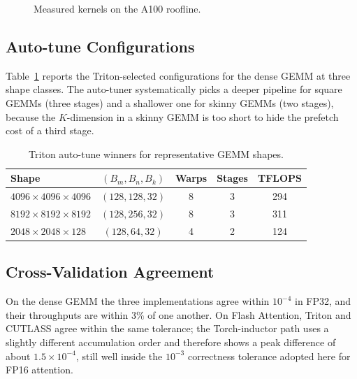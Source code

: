 \begin{figure}[H]
\centering
{}
\caption{Measured kernels on the A100 roofline.}
\label{fig:triton_roofline}
\end{figure}

\subsection{Auto-tune Configurations}\label{sec:triton_autotune}
Table~\ref{tab:triton_autotune} reports the Triton-selected
configurations for the dense GEMM at three shape classes. The
auto-tuner systematically picks a deeper pipeline for square
GEMMs (three stages) and a shallower one for skinny GEMMs (two
stages), because the $K$-dimension in a skinny GEMM is too short
to hide the prefetch cost of a third stage.

\begin{table}[h]
\centering
\caption{Triton auto-tune winners for representative GEMM shapes.}
\label{tab:triton_autotune}
\begin{tabular}{lcccc}
\toprule
\textbf{Shape} & $(B_m, B_n, B_k)$ & \textbf{Warps} & \textbf{Stages} & \textbf{TFLOPS} \\
\midrule
$4096 \times 4096 \times 4096$ & $(128,128,32)$ & 8 & 3 & 294 \\
$8192 \times 8192 \times 8192$ & $(128,256,32)$ & 8 & 3 & 311 \\
$2048 \times 2048 \times 128$  & $(128, 64,32)$ & 4 & 2 & 124 \\
\bottomrule
\end{tabular}
\end{table}

\subsection{Cross-Validation
Agreement}\label{sec:triton_agreement}
On the dense GEMM the three implementations agree within
$10^{-4}$ in FP32, and their throughputs are within $3\%$ of one
another. On Flash Attention, Triton and CUTLASS agree within the
same tolerance; the Torch-inductor path uses a slightly
different accumulation order and therefore shows a peak
difference of about $1.5 \times 10^{-4}$, still well inside the
$10^{-3}$ correctness tolerance adopted here for FP16 attention.

